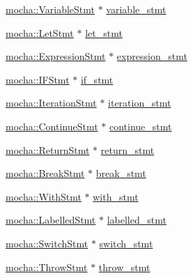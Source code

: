 \begin{DoxyCompactItemize}
\item 
\hyperlink{classmocha_1_1_variable_stmt}{mocha::VariableStmt} $\ast$ \hyperlink{unionyy_1_1_parser_implementation_1_1semantic__type_ac9bcc0c8c399d57c099e4657672464ca}{variable\_\-stmt}
\item 
\hyperlink{classmocha_1_1_let_stmt}{mocha::LetStmt} $\ast$ \hyperlink{unionyy_1_1_parser_implementation_1_1semantic__type_a56e23347704af6d3c861461f2ef4e14a}{let\_\-stmt}
\item 
\hyperlink{classmocha_1_1_expression_stmt}{mocha::ExpressionStmt} $\ast$ \hyperlink{unionyy_1_1_parser_implementation_1_1semantic__type_a5c1eb97f3f49851e33c364d81dab30ee}{expression\_\-stmt}
\item 
\hyperlink{classmocha_1_1_i_f_stmt}{mocha::IFStmt} $\ast$ \hyperlink{unionyy_1_1_parser_implementation_1_1semantic__type_ab50087c2fc338968f2b18c33fb4de756}{if\_\-stmt}
\item 
\hyperlink{classmocha_1_1_iteration_stmt}{mocha::IterationStmt} $\ast$ \hyperlink{unionyy_1_1_parser_implementation_1_1semantic__type_a072e9c3f6b348ef0f662b4a6d8b1b58d}{iteration\_\-stmt}
\item 
\hyperlink{classmocha_1_1_continue_stmt}{mocha::ContinueStmt} $\ast$ \hyperlink{unionyy_1_1_parser_implementation_1_1semantic__type_ae1b3122a350ae0e41541233d39a7b1ba}{continue\_\-stmt}
\item 
\hyperlink{classmocha_1_1_return_stmt}{mocha::ReturnStmt} $\ast$ \hyperlink{unionyy_1_1_parser_implementation_1_1semantic__type_ac3638e919938f0806311a5d443032fd1}{return\_\-stmt}
\item 
\hyperlink{classmocha_1_1_break_stmt}{mocha::BreakStmt} $\ast$ \hyperlink{unionyy_1_1_parser_implementation_1_1semantic__type_af2da2292ba7eedaec10069e227504bc3}{break\_\-stmt}
\item 
\hyperlink{classmocha_1_1_with_stmt}{mocha::WithStmt} $\ast$ \hyperlink{unionyy_1_1_parser_implementation_1_1semantic__type_ac7ea1e407d1acd113d81f5b8630a42f4}{with\_\-stmt}
\item 
\hyperlink{classmocha_1_1_labelled_stmt}{mocha::LabelledStmt} $\ast$ \hyperlink{unionyy_1_1_parser_implementation_1_1semantic__type_a772f041be87af166f38c70c94137ebe5}{labelled\_\-stmt}
\item 
\hyperlink{classmocha_1_1_switch_stmt}{mocha::SwitchStmt} $\ast$ \hyperlink{unionyy_1_1_parser_implementation_1_1semantic__type_a15069104eea537d91c1587f4ec1fab65}{switch\_\-stmt}
\item 
\hyperlink{classmocha_1_1_throw_stmt}{mocha::ThrowStmt} $\ast$ \hyperlink{unionyy_1_1_parser_implementation_1_1semantic__type_ae5ede8f17f98cc193b47b8f4fded0a94}{throw\_\-stmt}

\end{DoxyCompactItemize}
